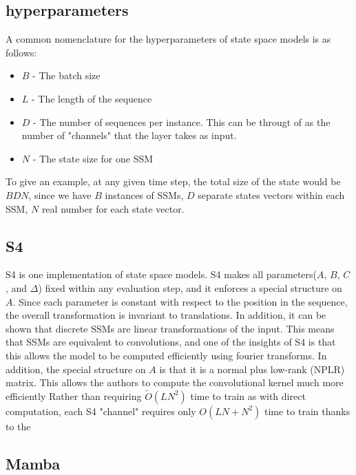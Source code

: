 \subsection{hyperparameters}
A common nomenclature for the hyperparameters of state space models is as
follows:
\begin{itemize}
    \item $B$ - The batch size
    \item $L$ - The length of the sequence
    \item $D$ - The number of sequences per instance. This can be througt of as
    the number of "channels" that the layer takes as input.
    \item $N$ - The state size for one SSM
\end{itemize}
To give an example, at any given time step, the total size of the state would be
$BDN$, since we have $B$ instances of SSMs, $D$ separate states vectors within
each SSM, $N$ real number for each state vector.

\subsection{S4}
S4\cite{gu2022efficiently} is one implementation of state space models.
S4 makes all parameters($A$, $B$, $C$, and $\Delta$) fixed within any evaluation
step, and it enforces a special structure on $A$.
Since each parameter is constant with respect to the position in the sequence,
the overall transformation is invariant to translations.
In addition, it can be shown that discrete SSMs are linear transformations of
the input.
This means that SSMs are equivalent to convolutions, and one of the insights of
S4 is that this allows the model to be computed efficiently using fourier
transforms.
In addition, the special structure on $A$ is that it is a normal plus low-rank
(NPLR) matrix. This allows the authors to compute the convolutional kernel much
more efficiently
Rather than requiring $\tilde O(LN^2)$ time to train as with direct computation,
each S4 "channel" requires only $O(LN + N^2)$ time to train thanks to the
\subsection{Mamba}

